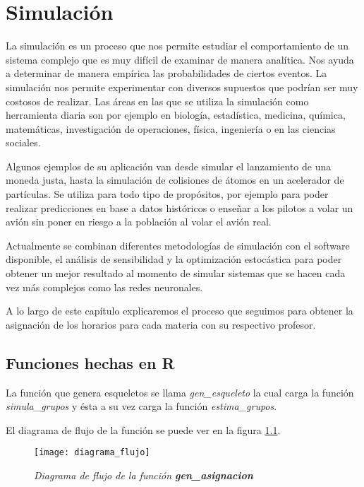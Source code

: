 \chapter{Simulación}

La simulación es un proceso que nos permite estudiar el comportamiento de un sistema complejo que es muy difícil de examinar de manera analítica. Nos ayuda a determinar de manera empírica las probabilidades de ciertos eventos. La simulación nos permite experimentar con diversos supuestos que podrían ser muy costosos de realizar. Las áreas en las que se utiliza la simulación como herramienta diaria son por ejemplo en biología, estadística, medicina, química, matemáticas, investigación de operaciones, física, ingeniería o en las ciencias sociales.

Algunos ejemplos de su aplicación van desde simular el lanzamiento de una moneda justa, hasta la simulación de colisiones de átomos en un acelerador de partículas. Se utiliza para todo tipo de propósitos, por ejemplo para poder realizar predicciones en base a datos históricos o enseñar a los pilotos a volar un avión sin poner en riesgo a la población al volar el avión real.

Actualmente se combinan diferentes metodologías de simulación con el software disponible, el análisis de sensibilidad y la optimización estocástica para poder obtener un mejor resultado al momento de simular sistemas que se hacen cada vez más complejos como las redes neuronales.

A lo largo de este capítulo explicaremos el proceso que seguimos para obtener la asignación de los horarios para cada materia con su respectivo profesor.

\section{Funciones hechas en R}

La función que genera esqueletos se llama \textit{gen\_esqueleto} la cual carga la función \textit{simula\_grupos} y ésta a su vez carga la función \textit{estima\_grupos}.


El diagrama de flujo de la función se puede ver en la figura \ref{DF_genAsig}.

\begin{figure}[H]
\centering
\texttt{[image: diagrama\_flujo]} %
\caption{\textit{Diagrama de flujo de la función \textbf{gen\_asignacion}}}\label{DF_genAsig}
\end{figure}


